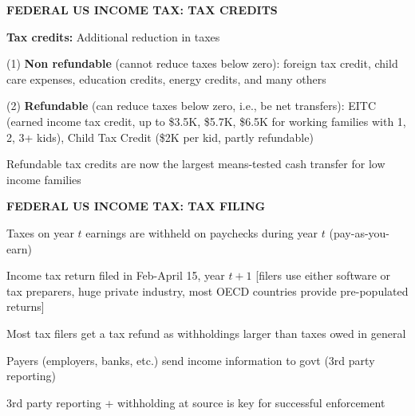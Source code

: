 \documentclass[landscape]{slides}
\begin{document}
\begin{slide}

\end{slide}

\begin{slide}
\begin{center}
{\bf FEDERAL US INCOME TAX: TAX CREDITS}
\end{center}


{\bf Tax credits:} Additional reduction in taxes

(1) {\bf Non refundable} (cannot reduce taxes below zero): foreign
tax credit, child care expenses, education credits, energy credits, and many others

(2) {\bf Refundable} (can reduce taxes below zero, i.e., be net
transfers): EITC (earned income tax credit, up to \$3.5K, \$5.7K, \$6.5K for working
families with 1, 2, 3+ kids), Child Tax Credit (\$2K per kid, partly
refundable)

Refundable tax credits are now the largest means-tested cash transfer for
low income families
\end{slide}

\begin{slide}

\end{slide}

\begin{slide}

\end{slide}


\begin{slide}
\begin{center}
{\bf FEDERAL US INCOME TAX: TAX FILING}
\end{center}
Taxes on year $t$ earnings are withheld on paychecks during year
$t$ (pay-as-you-earn)

Income tax return filed in Feb-April 15, year $t+1$ [filers use
either software or tax preparers, huge private industry, most OECD
countries provide pre-populated returns]

Most tax filers get a tax refund as withholdings larger than taxes
owed in general

Payers (employers, banks, etc.) send income information to govt
(3rd party reporting)

3rd party reporting + withholding at source is key for successful
enforcement

\end{slide}
\end{document}
